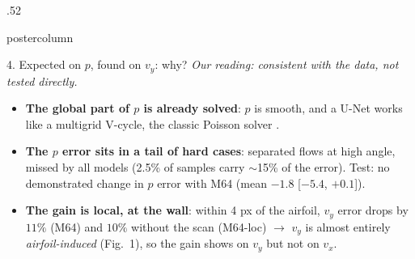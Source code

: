 \documentclass{beamer}
\begin{document}
\begin{frame}
\begin{columns}
\begin{column}{.52\textwidth}
\begin{beamercolorbox}[center]{postercolumn}
\begin{minipage}{.98\textwidth}
{\begin{myblock}{4. Expected on $p$, found on $v_y$: why?}
                        \textit{Our reading: consistent with the data, not tested directly.}
                        \begin{itemize}
                        	\item \textbf{The global part of $p$ is already solved}: $p$ is smooth, and a U-Net works like a multigrid V-cycle, the classic Poisson solver \cite{he2019mgnet}.
                        	\item \textbf{The $p$ error sits in a tail of hard cases}: separated flows at high angle, missed by all models (2.5\% of samples carry $\sim$15\% of the error). Test: no demonstrated change in $p$ error with M64 (mean $-1.8$ [$-5.4$, $+0.1$]).
                        	\item \textbf{The gain is local, at the wall}: within 4 px of the airfoil, $v_y$ error drops by $11\%$ (M64) and $10\%$ without the scan (M64-loc) $\rightarrow$ $v_y$ is almost entirely \emph{airfoil-induced} (Fig.~1), so the gain shows on $v_y$ but not on $v_x$.
                        \end{itemize}
                                            \vspace{0.3cm}
											\begin{figure}
                                            

\end{figure}
\end{myblock}}
\end{minipage}
\end{beamercolorbox}
\end{column}
\end{columns}
\end{frame}
\end{document}
